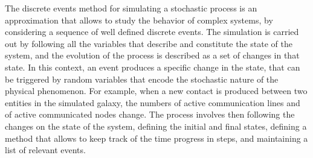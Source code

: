 The discrete events method for simulating a stochastic process is an
approximation that allows to study the behavior of complex systems,
by considering a sequence of well defined discrete events.
%
The simulation is carried out by following all the variables that
describe and constitute the state of the system, and the evolution of
the process is described as a set of changes in that state.
%
In this context, an event produces a specific change in the state,
that can be triggered by random variables that encode the stochastic
nature of the physical phenomenon.
%
For example, when a new contact is produced between two entities in
the simulated galaxy, the numbers of active communication lines and of
active communicated nodes change.
%
The process involves then following the changes on the state of the
system, defining the initial and final states, defining a method that
allows to keep track of the time progress in steps, and maintaining a
list of relevant events.


